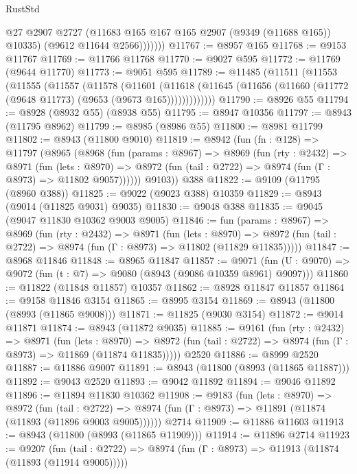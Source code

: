 \begin{lexlean}{RustStd}
\begin{coremodule}
                @27
                @2907
                @2727
                (@11683 @165 @167 @165 @2907 (@9349 (@11688 @165)) @10335)
                (@9612 @11644 @2566)))))))
@11767 := @8957 @165
@11768 := @9153 @11767
@11769 := @11766 @11768
@11770 := @9027 @595
@11772 := @11769 (@9644 @11770)
@11773 := @9051 @595
@11789 := @11485
    (@11511
      (@11553
        (@11555
          (@11557
            (@11578
              (@11601
                (@11618
                  (@11645 (@11656 (@11660 (@11772 (@9648 @11773) (@9653 (@9673 @165)))))))))))))
@11790 := @8926 @55
@11794 := @8928 (@8932 @55) (@8938 @55)
@11795 := @8947 @10356
@11797 := @8943 (@11795 @8962)
@11799 := @8985 (@8986 @55)
@11800 := @8981 @11799
@11802 := @8943 (@11800 @9010)
@11819 := @8942
    (fun (fn : @128) =>
    @11797
      (@8965
        (@8968
          (fun (params : @8967) =>
          @8969
            (fun (rty : @2432) =>
            @8971
              (fun (lets : @8970) =>
              @8972 (fun (tail : @2722) => @8974 (fun (Γ : @8973) => @11802 @9057))))))
        @9103))
    @388
@11822 := @9109 (@11795 (@8960 @388))
@11825 := @9022 (@9023 @388) @10359
@11829 := @8943 (@9014 (@11825 @9031) @9035)
@11830 := @9048 @388
@11835 := @9045 (@9047 @11830 @10362 @9003 @9005)
@11846 := fun (params : @8967) =>
  @8969
    (fun (rty : @2432) =>
    @8971
      (fun (lets : @8970) =>
      @8972 (fun (tail : @2722) => @8974 (fun (Γ : @8973) => @11802 (@11829 @11835)))))
@11847 := @8968 @11846
@11848 := @8965 @11847
@11857 := @9071
    (fun (U : @9070) => @9072 (fun (t : @7) => @9080 (@8943 (@9086 @10359 @8961) @9097)))
@11860 := @11822 (@11848 @11857) @10357
@11862 := @8928 @11847 @11857
@11864 := @9158 @11846 @3154
@11865 := @8995 @3154
@11869 := @8943 (@11800 (@8993 (@11865 @9008)))
@11871 := @11825 (@9030 @3154)
@11872 := @9014 @11871
@11874 := @8943 (@11872 @9035)
@11885 := @9161
    (fun (rty : @2432) =>
    @8971
      (fun (lets : @8970) =>
      @8972 (fun (tail : @2722) => @8974 (fun (Γ : @8973) => @11869 (@11874 @11835)))))
    @2520
@11886 := @8999 @2520
@11887 := @11886 @9007
@11891 := @8943 (@11800 (@8993 (@11865 @11887)))
@11892 := @9043 @2520
@11893 := @9042 @11892
@11894 := @9046 @11892
@11896 := @11894 @11830 @10362
@11908 := @9183
    (fun (lets : @8970) =>
    @8972
      (fun (tail : @2722) =>
      @8974 (fun (Γ : @8973) => @11891 (@11874 (@11893 (@11896 @9003 @9005))))))
    @2714
@11909 := @11886 @11603
@11913 := @8943 (@11800 (@8993 (@11865 @11909)))
@11914 := @11896 @2714
@11923 := @9207
    (fun (tail : @2722) => @8974 (fun (Γ : @8973) => @11913 (@11874 (@11893 (@11914 @9005)))))

\end{coremodule}
\end{lexlean}
